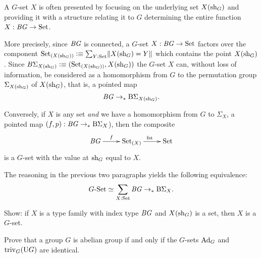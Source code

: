 \begin{remark}
  \label{remark:GsetsareGsets}
  A $G$-set $X$ is often presented by focusing on the underlying set $X(\mathrm{sh}_G)$
and providing it with a structure relating it to $G$ determining
the entire function $X : \mathit{B}\mathit{G}\to\mathrm{Set}$.

More precisely, since $\mathit{B}\mathit{G}$ is connected, a $G$-set $X : \mathit{B}\mathit{G}\to\mathrm{Set}$ factors
over the component $\conncomp \Set {X(\shape_G)} \defequi \sum_{Y:\Set}\Trunc{X(\shape_G)=Y}$
which contains the point $X(\mathrm{sh}_G)$.
Since $B\Sigma_{X(\shape_G)}\defequi(\conncomp \Set {X(\shape_G)},X(\shape_G))$ the $G$-set $X$ can,
without loss of information, be considered as a homomorphism from $G$ to
the permutation group $\Sigma_{X(\mathrm{sh}_G)}$ of $X(\mathrm{sh}_G)$,
that is, a pointed map
$$\mathit{B}\mathit{G}\to_\ast\mathrm{B}\Sigma_{X(\mathrm{sh}_G)}.$$

Conversely, if $X$ is any set \emph{and} we have a homomorphism
from $G$ to $\Sigma_X$, \ie a pointed map $(f,p) : \mathit{B}\mathit{G}\to_\ast \mathrm{B}\Sigma_{X}$),
then the composite
$$\xymatrix{\BG\ar[r]^-{f}&\conncomp \Set X \ar[r]^{\fst}&\Set}$$
is a $G$-set with the value at $\mathrm{sh}_G$ equal to $X$.

The reasoning in the previous two paragraphs yields the following equivalence:
\[
\mathord{G\textrm{-}\mathrm{Set}} \simeq \sum_{X:\mathrm{Set}} \mathit{B}\mathit{G} \to_\ast \mathrm{B}\Sigma_X.
\]
\end{remark}

\begin{xca}
Show:  if $X$ is a type family with index type $\mathit{B}\mathit{G}$ and $X(\mathrm{sh}_G)$ is a set,
then $X$ is a $G$-set.
\end{xca}

\begin{xca}
  Prove that a group $G$ is abelian group if and only if the $G$-sets $\Ad_G$ and $\mathrm{triv}_G(\mathrm{U} G)$ are identical.
\end{xca}

